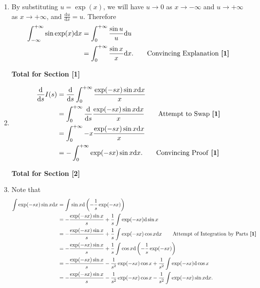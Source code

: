 \documentclass[12pt]{article}
\begin{document}
            \begin{enumerate}
                \item By substituting \(u = \exp(x)\), we will have \(u \to 0\) as \(x \to -\infty\) and \(u \to +\infty\) as \(x \to +\infty\), and \(\frac{\mathrm{d}u}{\mathrm{d}x} = u\). Therefore
                    \begin{align*}
                        \int_{-\infty}^{+\infty} \sin \exp(x) \mathrm{d}x &= \int_0^{+\infty} \frac{\sin u}{u} \mathrm{d}u\\
                        &= \int_0^{+\infty} \frac{\sin x}{x} \mathrm{d}x. \tag*{Convincing Explanation \textbf{[1]}}
                    \end{align*}
                
                    \hfill\textbf{Total for Section [1]}
                    
                \item  
                    \begin{align*}
                        \frac{\mathrm{d}}{\mathrm{d}s} I(s) &= \frac{\mathrm{d}}{\mathrm{d}s} \int_0^{+\infty}\frac{\exp(-sx) \sin x \mathrm{d}x}{x}\\
                        &= \int_0^{+\infty} \frac{\mathrm{d}}{\mathrm{d}s}  \frac{\exp(-sx)\sin x \mathrm{d}x}{x} \tag*{Attempt to Swap \textbf{[1]}}\\
                        &= \int_0^{+\infty} -x \frac{\exp(-sx)\sin x \mathrm{d}x}{x}\\
                        &= - \int_0^{+\infty} \exp(-sx)\sin x \mathrm{d}x. \tag*{Convincing Proof \textbf{[1]}}
                    \end{align*}


                    \hfill\textbf{Total for Section [2]}
            
                \item 
                    Note that
                    \begin{align*}
                        \int \exp(-sx) \sin x \mathrm{d}x &= \int \sin x \mathrm{d} \left(- \frac{1}{s} \exp(-sx)\right)\\
                        &= -\frac{\exp(-sx) \sin x}{s} + \frac{1}{s} \int \exp(-sx) \mathrm{d} \sin x\\
                        &= -\frac{\exp(-sx) \sin x}{s} + \frac{1}{s} \int \exp(-sx) \cos x \mathrm{d}x \tag*{Attempt of Integration by Parts \textbf{[1]}}\\
                        &= -\frac{\exp(-sx) \sin x}{s} + \frac{1}{s} \int \cos x \mathrm{d}\left(- \frac{1}{s} \exp(-sx)\right)\\
                        &= - \frac{\exp(-sx) \sin x}{s} - \frac{1}{s^2} \exp(-sx) \cos x + \frac{1}{s^2} \int \exp(-sx) \mathrm{d} \cos x\\
                        &= - \frac{\exp(-sx) \sin x}{s} - \frac{1}{s^2} \exp(-sx) \cos x - \frac{1}{s^2} \int \exp(-sx) \sin x\mathrm{d} x.\\
                    \end{align*}


\end{enumerate}
\end{document}
